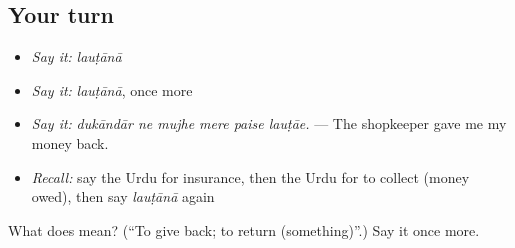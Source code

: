 \subsection*{Your turn}
\begin{itemize}
\raggedright
  \item \emph{Say it:} \emph{lauṭānā}
  \item \emph{Say it:} \emph{lauṭānā}, once more
  \item \emph{Say it:} \emph{dukāndār ne mujhe mere paise lauṭāe.} — The shopkeeper gave me my money back.
  \item \emph{Recall:} say the Urdu for insurance, then the Urdu for to collect (money owed), then say \emph{lauṭānā} again
\end{itemize}

\begin{tcolorbox}[breakable,colback=teal!4,colframe=teal!35!black,title={Before you move on}]
What does  mean? (\textquotedblleft{}To give back; to return (something)\textquotedblright{}.) Say it once more.
\end{tcolorbox}

